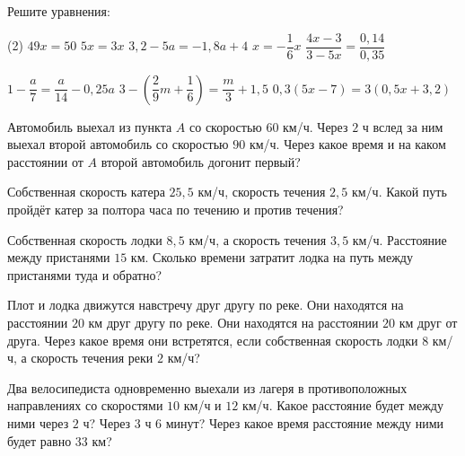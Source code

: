 %
%

\begin{class}[number=1]
	\begin{listofex}
		\item Решите уравнения: %
		\begin{tasks}(2)
			\task \( 49x=50 \)
			\task \( 5x=3x \)
			\task \( 3,2-5a=-1,8a+4 \)
			\task \( x=-\dfrac{ 1 }{ 6 }x \)
			\task \( \dfrac{ 4x-3 }{ 3-5x }=\dfrac{ 0,14 }{ 0,35 } \)
			
			\task \( 1-\dfrac{ a }{7  }=\dfrac{ a }{ 14 }-0,25a \)
			\task \( 3 - \left( \dfrac{ 2 }{ 9 }m+\dfrac{ 1 }{ 6 } \right)=\dfrac{ m }{ 3 }+1,5  \)
			\task \( 0,3(5x-7)=3(0,5x+3,2) \)
			
		\end{tasks}
		\item Автомобиль выехал из пункта \(A\) со скоростью \(60\) км/ч. Через \(2\) ч вслед за ним выехал второй автомобиль со скоростью \(90\) км/ч. Через какое время и на каком расстоянии от \(A\) второй автомобиль догонит первый?
		\item Собственная скорость катера \(25,5\) км/ч, скорость течения \(2,5\) км/ч. Какой путь пройдёт катер за полтора часа по течению и против течения?
		\item Собственная скорость лодки \(8,5\) км/ч, а скорость течения \(3,5\) км/ч. Расстояние между пристанями \(15\) км. Сколько времени затратит лодка на путь между пристанями туда и обратно?
		\item Плот и лодка движутся навстречу друг другу по реке. Они находятся на расстоянии \(20\) км друг другу по реке. Они находятся на расстоянии \(20\) км друг от друга. Через какое время они встретятся, если собственная скорость лодки \(8\) км/ч, а скорость течения реки \(2\) км/ч?
		\item Два велосипедиста одновременно выехали из лагеря в противоположных направлениях со скоростями \(10\) км/ч и \(12\) км/ч. Какое расстояние будет между ними через \(2\) ч? Через \(3\) ч \(6\) минут? Через какое время расстояние между ними будет равно \(33\) км?
	\end{listofex}
\end{class}

